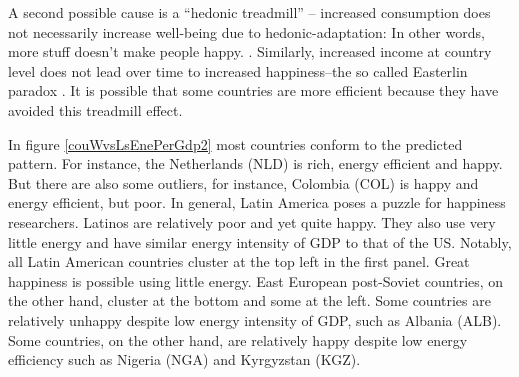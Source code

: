 \documentclass[10pt, letterpaper]{article}
\begin{document}
\begin{spacing}{1.4}
A second possible cause is a ``hedonic treadmill'' \cite{brickman78cj} -- increased consumption does not necessarily
increase well-being due to hedonic-adaptation: In other words, more stuff doesn't make people happy. . Similarly, increased income at country level does not lead over time to increased happiness--the so called Easterlin paradox
\cite{easterlin74,easterlin10B}.  It is possible that some countries are more efficient because they have avoided this treadmill effect.




In figure \ref{couWvsLsEnePerGdp2} most countries conform to the predicted pattern. 
 For instance,  the Netherlands (NLD) is rich,  energy efficient and happy. But
 there are also some outliers, for instance,  Colombia (COL) is  happy and energy
 efficient,  but poor.  
In general, Latin America poses a puzzle for happiness researchers. Latinos are
relatively poor and yet quite happy. They also use very little  energy and have similar energy intensity of GDP to that of the  US. Notably, all Latin
 American countries cluster at the top left in the
first panel.  Great happiness is possible using little  energy. East European
post-Soviet countries, on the other hand, cluster at the bottom and some at the
left. Some countries are relatively unhappy despite low energy intensity of GDP,
such as Albania (ALB). Some countries, on the other hand, are relatively happy
despite low energy efficiency such as Nigeria (NGA) and Kyrgyzstan (KGZ).    


\end{spacing}
\end{document}
